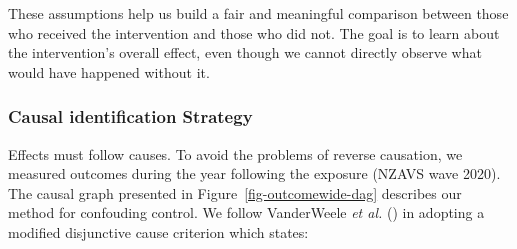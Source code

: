 \documentclass[
  singlecolumn,
  9pt]{article}
\begin{document}
These assumptions help us build a fair and meaningful comparison between
those who received the intervention and those who did not. The goal is
to learn about the intervention's overall effect, even though we cannot
directly observe what would have happened without it.

\subsubsection{Causal identification
Strategy}\label{causal-identification-strategy}

Effects must follow causes. To avoid the problems of reverse causation,
we measured outcomes during the year following the exposure (NZAVS wave
2020). The causal graph presented in Figure~\ref{fig-outcomewide-dag}
describes our method for confouding control. We follow VanderWeele
\emph{et al.} () in adopting a
modified disjunctive cause criterion which states:
\end{document}
